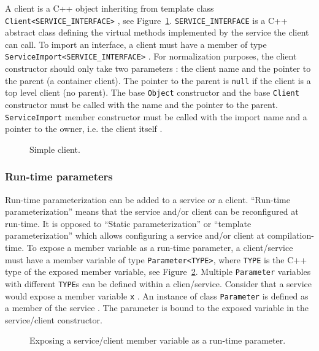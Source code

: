 A client is a C++ object inheriting from template class \texttt{Client<SERVICE\_INTERFACE>} , see Figure~\ref{fig:tms320c3x_simple_client}.
\texttt{SERVICE\_INTERFACE} is a C++ abstract class defining the virtual methods implemented by the service the client can call.
To import an interface, a client must have a member of type \texttt{ServiceImport<SERVICE\_INTERFACE>} .
For normalization purposes, the client constructor should only take two parameters : the client name and the pointer to the parent (a container client).
The pointer to the parent is \texttt{null} if the client is a top level client (no parent).
The base \texttt{Object} constructor  and the base \texttt{Client} constructor  must be called with the name and the pointer to the parent.
\texttt{ServiceImport} member constructor must be called with the import name and a pointer to the owner, i.e. the client itself .


\begin{figure}[h]
  \begin{center}
    
    \caption{\label{fig:tms320c3x_simple_client} Simple client.}
  \end{center}
\end{figure}

\subsubsection{Run-time parameters}

Run-time parameterization can be added to a service or a client.
``Run-time parameterization'' means that the service and/or client can be reconfigured at run-time.
It is opposed to ``Static parameterization'' or ``template parameterization'' which allows configuring a service and/or client at compilation-time.
To expose a member variable as a run-time parameter, a client/service must have a member variable of type \texttt{Parameter<TYPE>}, where \texttt{TYPE} is the C++ type of the exposed member variable, see Figure~\ref{fig:tms320c3x_run_time_parameter}.
Multiple \texttt{Parameter} variables with different \texttt{TYPE}s can be defined within a clien/service.
Consider that a service would expose a member variable \texttt{x} .
An instance of class \texttt{Parameter} is defined as a member of the service . 
The parameter is bound to the exposed variable  in the service/client constructor.

\begin{figure}[h]
  \begin{center}
    
    \caption{\label{fig:tms320c3x_run_time_parameter} Exposing a service/client member variable as a run-time parameter.}
  \end{center}
\end{figure}

